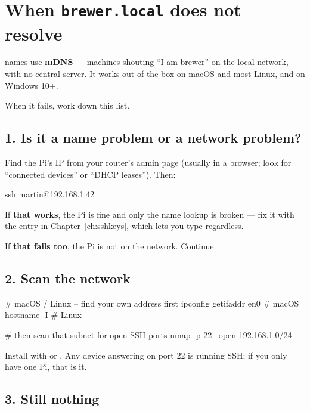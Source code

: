 \section{When \texttt{brewer.local} does not resolve}

 names use \textbf{mDNS} --- machines shouting ``I am brewer'' on
the local network, with no central server. It works out of the box on macOS and
most Linux, and on Windows 10+.

When it fails, work down this list.

\subsection{1. Is it a name problem or a network problem?}

Find the Pi's IP from your router's admin page (usually
 in a browser; look for ``connected devices'' or ``DHCP
leases''). Then:

\begin{shell}
ssh martin@192.168.1.42
\end{shell}

If \textbf{that works}, the Pi is fine and only the name lookup is broken --- fix
it with the  entry in
Chapter~\ref{ch:sshkeys}, which lets you type  regardless.

If \textbf{that fails too}, the Pi is not on the network. Continue.

\subsection{2. Scan the network}

\begin{shell}
# macOS / Linux -- find your own address first
ipconfig getifaddr en0        # macOS
hostname -I                   # Linux

# then scan that subnet for open SSH ports
nmap -p 22 --open 192.168.1.0/24
\end{shell}

Install  with  or . Any device answering on port 22 is running SSH; if you only have one Pi,
that is it.

\subsection{3. Still nothing}

